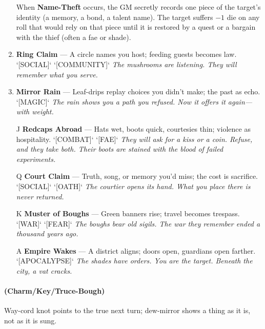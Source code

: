 \begin{enumerate}
\begin{tcolorbox}[colback=red!3,title=Name-Theft Mechanics,breakable]
    When \textbf{Name-Theft} occurs, the GM secretly records one piece of the target's identity (a memory, a bond, a talent name). The target suffers $-1$ die on any roll that would rely on that piece until it is restored by a quest or a bargain with the thief (often a fae or shade).
  \end{tcolorbox}
\item \textbf{Ring Claim} --- A circle names you host; feeding guests becomes law. `[SOCIAL]` `[COMMUNITY]`
  \hfill \textit{The mushrooms are listening. They will remember what you serve.}
\item \textbf{Mirror Rain} --- Leaf-drips replay choices you didn't make; the past as echo. `[MAGIC]`
  \hfill \textit{The rain shows you a path you refused. Now it offers it again---with weight.}
\item[J] \textbf{Redcaps Abroad} --- Hats wet, boots quick, courtesies thin; violence as hospitality. `[COMBAT]` `[FAE]`
  \hfill \textit{They will ask for a kiss or a coin. Refuse, and they take both. Their boots are stained with the blood of failed experiments.}
\item[Q] \textbf{Court Claim} --- Truth, song, or memory you'd miss; the cost is sacrifice. `[SOCIAL]` `[OATH]`
  \hfill \textit{The courtier opens its hand. What you place there is never returned.}
\item[K] \textbf{Muster of Boughs} --- Green banners rise; travel becomes trespass. `[WAR]` `[FEAR]`
  \hfill \textit{The boughs bear old sigils. The war they remember ended a thousand years ago.}
\item[A] \textbf{Empire Wakes} --- A district aligns; doors open, guardians open farther. `[APOCALYPSE]`
  \hfill \textit{The shades have orders. You are the target. Beneath the city, a vat cracks.}
\end{enumerate}

\paragraph*{(Charm/Key/Truce-Bough)} Way-cord knot points to the true next turn; dew-mirror shows a thing as it is, not as it is sung.

